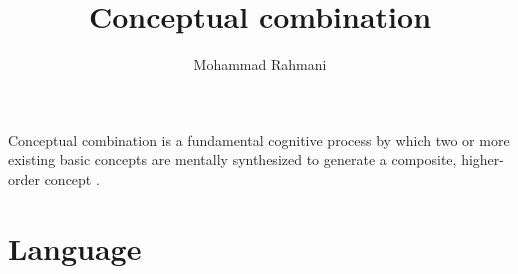 \documentclass[a4paper]{article}
\title{Conceptual combination}
\date{}
\author{Mohammad Rahmani}
\begin{document}
\maketitle
    Conceptual combination is a fundamental cognitive process by which two or more existing basic concepts are mentally synthesized to generate a composite, higher-order concept .

    \section{Language}
    
    
\end{document}
